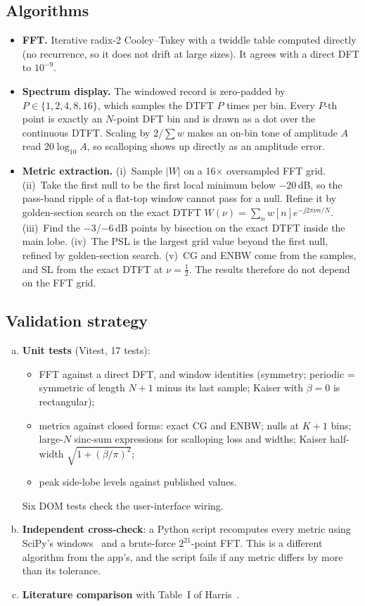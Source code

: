 \documentclass[11pt,a4paper]{article}
\begin{document}
\subsection{Algorithms}
\begin{itemize}
  \item \textbf{FFT.} Iterative radix-2 Cooley--Tukey with a twiddle table computed directly
        (no recurrence, so it does not drift at large sizes). It agrees with a direct DFT to $10^{-9}$.
  \item \textbf{Spectrum display.} The windowed record is zero-padded by
        $P\in\{1,2,4,8,16\}$, which samples the DTFT $P$ times per bin. Every $P$-th point is
        exactly an $N$-point DFT bin and is drawn as a dot over the continuous DTFT. Scaling by
        $2/\sum w$ makes an on-bin tone of amplitude $A$ read $20\log_{10}A$, so scalloping
        shows up directly as an amplitude error.
  \item \textbf{Metric extraction.} (i)~Sample $|W|$ on a 16$\times$ oversampled FFT grid.
        (ii)~Take the first null to be the first local minimum below $-20$\,dB, so the pass-band
        ripple of a flat-top window cannot pass for a null. Refine it by golden-section search
        on the exact DTFT $W(\nu)=\sum_n w[n]e^{-j2\pi\nu n/N}$. (iii)~Find the $-3$/$-6$\,dB
        points by bisection on the exact DTFT inside the main lobe. (iv)~The PSL is the largest
        grid value beyond the first null, refined by golden-section search. (v)~CG and ENBW come
        from the samples, and SL from the exact DTFT at $\nu=\tfrac12$. The results therefore do
        not depend on the FFT grid.
\end{itemize}

\subsection{Validation strategy}
\begin{enumerate}[(a)]
  \item \textbf{Unit tests} (Vitest, 17 tests):
    \begin{itemize}
      \item FFT against a direct DFT, and window identities (symmetry; periodic = symmetric of
            length $N{+}1$ minus its last sample; Kaiser with $\beta=0$ is rectangular);
      \item metrics against closed forms: exact CG and ENBW; nulls at $K{+}1$ bins; large-$N$
            sinc-sum expressions for scalloping loss and widths; Kaiser half-width
            $\sqrt{1+(\beta/\pi)^2}$;
      \item peak side-lobe levels against published values.
    \end{itemize}
    Six DOM tests check the user-interface wiring.
  \item \textbf{Independent cross-check}: a Python script recomputes every metric using SciPy's
        windows~\cite{scipy} and a brute-force $2^{21}$-point FFT. This is a different algorithm
        from the app's, and the script fails if any metric differs by more than its tolerance.
  \item \textbf{Literature comparison} with Table~I of Harris~\cite{harris}.
\end{enumerate}
\end{document}
